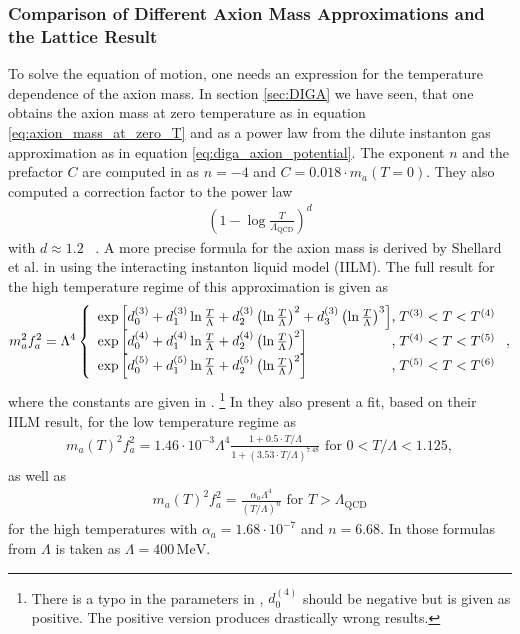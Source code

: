\documentclass[twoside,a4paper, 12pt]{article}
\numberwithin{equation}{section}
\begin{document}
\subsubsection{Comparison of Different Axion Mass Approximations and the Lattice Result}
To solve the equation of motion, one needs an expression for the temperature
dependence of the axion mass.
In section \ref{sec:DIGA} we have seen, that one obtains the axion mass at zero 
temperature as in equation \eqref{eq:axion_mass_at_zero_T} and as a power law from the dilute instanton gas approximation as in equation \eqref{eq:diga_axion_potential}. 
The exponent $n$ and the prefactor $C$ are computed in \cite[Sec. 2.1]{Fox:2004kb} as
$n = -4$ and $C = 0.018 \cdot m_a(T = 0)$.
They also computed a correction factor to the power law
\begin{align}
    \left( 1 - \log \frac{T}{\Lambda_\mathrm{QCD}}\right)^d
\end{align}
with $d \approx 1.2$ \, .
A more precise formula for the axion mass is derived by Shellard et al. in \cite{AxionCosmoRev} using the interacting instanton liquid
model (IILM).
The full result for the high temperature regime of this approximation is given as \cite[Sec. III, Eq. 20]{AxionCosmoRev}
\begin{align}
m^2_a f^2_a = \Lambda^4
\left\{
 \begin{array}{l@{,\;}l}
 \exp\left[ d^{(3)}_0 + d^{(3)}_1 \ln\frac{T}{\Lambda} + d^{(3)}_2 \left(\ln\frac{T}{\Lambda}\right)^2 + d^{(3)}_3 \left(\ln\frac{T}{\Lambda}\right)^3 \right] & T^{(3)} < T < T^{(4)}\\
 \exp\left[ d^{(4)}_0 + d^{(4)}_1 \ln\frac{T}{\Lambda} + d^{(4)}_2 \left(\ln\frac{T}{\Lambda}\right)^2 \right] & T^{(4)} < T < T^{(5)}\\
\exp\left[ d^{(5)}_0 + d^{(5)}_1 \ln\frac{T}{\Lambda} + d^{(5)}_2 \left(\ln\frac{T}{\Lambda}\right)^2 \right] & T^{(5)} < T < T^{(6)}\\
\end{array}
\right. ,
\end{align}
where the constants are given
in \cite[Sec. III, Eq. 21]{AxionCosmoRev}. \footnote{There is a typo in the parameters in \cite[Sec. III, Eq. 21]{AxionCosmoRev}, $d_0^{(4)}$ should be negative but is given as positive. The positive version produces drastically wrong results.}
In \cite{AxionCosmoRev} they also present 
a fit, based on their IILM result, for the low temperature regime as \cite[Sec. III, Page 8, Eq. 19]{AxionCosmoRev}
\begin{align}
    \label{eq:m_a_low_temp_shellard}
    m_a(T)^2 f_a^2 = 1.46 \cdot 10^{-3} \Lambda^4 \frac{1 + 0.5 \cdot T / \Lambda}{1 + (3.53 \cdot T / \Lambda)^{7.48}} \, \, \mathrm{for} \, \, 0 < T / \Lambda < 1.125,
\end{align}
as well as \cite[Sec III, Page 9, Eq. 22]{AxionCosmoRev} 
\begin{align}
    \label{eq:m_a_high_temp_shellard}
    m_a(T)^2 f_a^2 = \frac{\alpha_a \Lambda^4}{(T / \Lambda)^n} \, \, \mathrm{for} \, \, T > \Lambda_\mathrm{QCD}
\end{align}
for the high temperatures with $\alpha_a = 1.68 \cdot 10^{-7}$ and $n = 6.68$.
In those formulas from \cite{LatticQCD4Cosmo} $\Lambda$ is taken as $\Lambda = 400 \, \mathrm{MeV}$.
\end{document}
